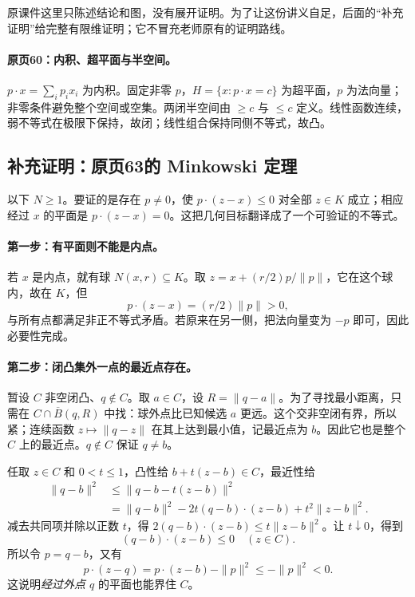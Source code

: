 原课件这里只陈述结论和图，没有展开证明。为了让这份讲义自足，后面的“补充证明”给完整有限维证明；它不冒充老师原有的证明路线。


\paragraph{原页60：内积、超平面与半空间。}$p\cdot x=\sum_i p_ix_i$ 为内积。固定非零 $p$，$H=\{x:p\cdot x=c\}$ 为超平面，$p$ 为法向量；非零条件避免整个空间或空集。两闭半空间由 $\ge c$ 与 $\le c$ 定义。线性函数连续，弱不等式在极限下保持，故闭；线性组合保持同侧不等式，故凸。




\subsection*{补充证明：原页63的 Minkowski 定理}
以下 $N\ge1$。要证的是存在 $p\ne0$，使 $p\cdot(z-x)\le0$ 对全部 $z\in K$ 成立；相应经过 $x$ 的平面是 $p\cdot(z-x)=0$。这把几何目标翻译成了一个可验证的不等式。

\paragraph{第一步：有平面则不能是内点。}
若 $x$ 是内点，就有球 $N(x,r)\subseteq K$。取 $z=x+(r/2)p/\|p\|$，它在这个球内，故在 $K$，但
\[p\cdot(z-x)=(r/2)\|p\|>0,
\]
与所有点都满足非正不等式矛盾。若原来在另一侧，把法向量变为 $-p$ 即可，因此必要性完成。

\paragraph{第二步：闭凸集外一点的最近点存在。}
暂设 $C$ 非空闭凸、$q\notin C$。取 $a\in C$，设 $R=\|q-a\|$。为了寻找最小距离，只需在 $C\cap\overline B(q,R)$ 中找：球外点比已知候选 $a$ 更远。这个交非空闭有界，所以紧；连续函数 $z\mapsto\|q-z\|$ 在其上达到最小值，记最近点为 $b$。因此它也是整个 $C$ 上的最近点。$q\notin C$ 保证 $q\ne b$。

任取 $z\in C$ 和 $0<t\le1$，凸性给 $b+t(z-b)\in C$，最近性给
\begin{align*}
\|q-b\|^2&\le\|q-b-t(z-b)\|^2\\
&=\|q-b\|^2-2t(q-b)\cdot(z-b)+t^2\|z-b\|^2.
\end{align*}
减去共同项并除以正数 $t$，得 $2(q-b)\cdot(z-b)\le t\|z-b\|^2$。让 $t\downarrow0$，得到
\[(q-b)\cdot(z-b)\le0\quad(z\in C).\tag{*}
\]
所以令 $p=q-b$，又有
\[p\cdot(z-q)=p\cdot(z-b)-\|p\|^2\le-\|p\|^2<0.
\]
这说明\emph{经过外点 $q$} 的平面也能界住 $C$。


